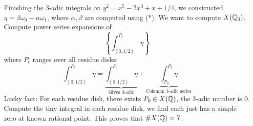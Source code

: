 Finishing the 3-adic integrals on $y^2= x^5 - 2x^3 + x + 1/4$, we constructed $\eta= \beta \omega_0 - \alpha \omega_1$, where $\alpha,\beta$ are computed using (*). We want to compute $X(\mathbb{Q}_3)$. Compute power series expansions of
	\[
	\left\{ \int_{(0,1/2)}^{P_t} \eta \right\}
	\]
where $P_t$ ranges over all residue disks:
	\[
	\int_{(0,1/2)}^{P_t} \eta= \underbrace{\int_{(0,1/2)}^{P_0} \eta}_{\text{Gives 3-adic}} + \underbrace{\int_{P_0}^{P_t} \eta}_{\text{Coleman 3-adic series}}
	\]
Lucky fact: For each residue disk, there exists $P_0 \in X(\mathbb{Q})$, the 3-adic number is 0. Compute the tiny integral in each residue disk, we find each just has a simple zero at known rational point. This proves that $\#X(\mathbb{Q})= 7$. 








 